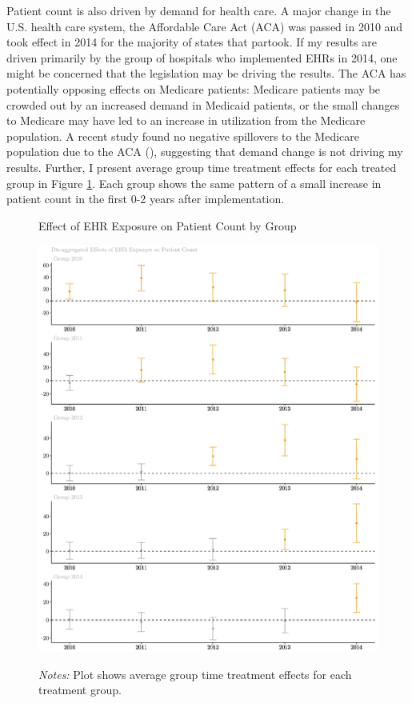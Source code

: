 \documentclass[11pt]{article}
\begin{document}
Patient count is also driven by demand for health care. A major change in the U.S. health care system, the Affordable Care Act (ACA) was passed in 2010 and took effect in 2014 for the majority of states that partook. If my results are driven primarily by the group of hospitals who implemented EHRs in 2014, one might be concerned that the legislation may be driving the results. The ACA has potentially opposing effects on Medicare patients: Medicare patients may be crowded out by an increased demand in Medicaid patients, or the small changes to Medicare may have led to an increase in utilization from the Medicare population. A recent study found no negative spillovers to the Medicare population due to the ACA (\cite{carey2020impact}), suggesting that demand change is not driving my results. Further, I present average group time treatment effects for each treated group in Figure \ref{fig:patientgroup}. Each group shows the same pattern of a small increase in patient count in the first 0-2 years after implementation. 

\begin{figure}[ht]
    \centering
    \captionsetup{width=.6\linewidth}
    \caption{Effect of EHR Exposure on Patient Count by Group}
    \includegraphics[scale=.47]{Objects/patient_group.pdf}
    \label{fig:patientgroup}
    \vspace{2mm}
    \caption*{\footnotesize{\textit{Notes:} Plot shows average group time treatment effects for each treatment group.}}
\end{figure}
\end{document}
